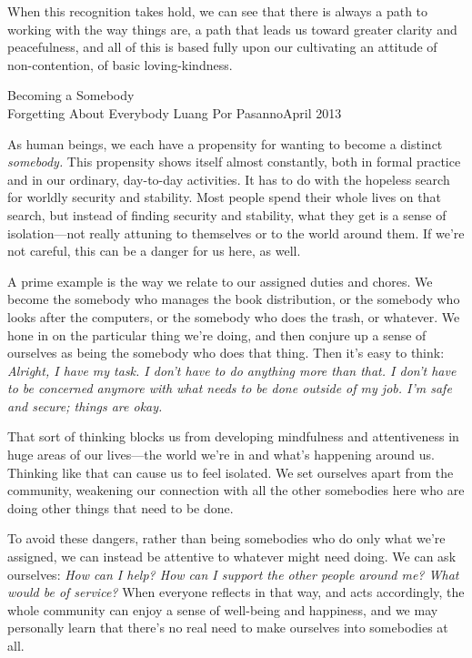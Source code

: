 When this recognition takes hold, we can see that there is always a 
path to working with the way things are, a path that leads us toward 
greater clarity and peacefulness, and all of this is based fully upon 
our cultivating an attitude of non-contention, of basic loving-kindness.

{Becoming a Somebody\\Forgetting About Everybody}
{Luang Por Pasanno}{April 2013}

As human beings, we each have a propensity for wanting to become a 
distinct \emph{somebody.} This propensity shows itself almost 
constantly, both in formal practice and in our ordinary, day-to-day 
activities. It has to do with the hopeless search for worldly security 
and stability. Most people spend their whole lives on that search, but 
instead of finding security and stability, what they get is a sense of 
isolation---not really attuning to themselves or to the world around 
them. If we're not careful, this can be a danger for us here, as well.

A prime example is the way we relate to our assigned duties and chores. 
We become the somebody who manages the book distribution, or the 
somebody who looks after the computers, or the somebody who does the 
trash, or whatever. We hone in on the particular thing we're doing, and 
then conjure up a sense of ourselves as being the somebody who does 
that thing. Then it's easy to think: \emph{Alright, I have my task. I 
don't have to do anything more than that. I don't have to be concerned 
anymore with what needs to be done outside of my job. I'm safe and 
secure; things are okay.}

That sort of thinking blocks us from developing mindfulness and 
attentiveness in huge areas of our lives---the world we're in and 
what's happening around us. Thinking like that can cause us to feel 
isolated. We set ourselves apart from the community, weakening our 
connection with all the other somebodies here who are doing other 
things that need to be done.

To avoid these dangers, rather than being somebodies who do only what 
we're assigned, we can instead be attentive to whatever might need 
doing. We can ask ourselves: \emph{How can I help? How can I support 
the other people around me? What would be of service?} When everyone 
reflects in that way, and acts accordingly, the whole community can 
enjoy a sense of well-being and happiness, and we may personally learn 
that there's no real need to make ourselves into somebodies at all.

